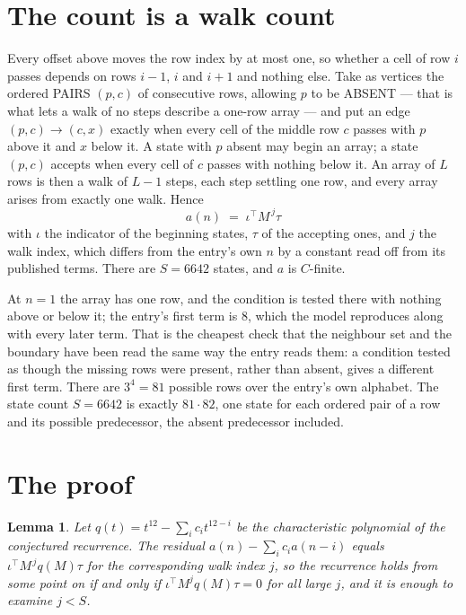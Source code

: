 \documentclass[11pt,a4paper]{article}
\theoremstyle{plain}
\newtheorem{lemma}[theorem]{Lemma}
\theoremstyle{definition}
\begin{document}
\section{The count is a walk count}

Every offset above moves the row index by at most one, so whether a cell of row $i$ passes
depends on rows $i-1$, $i$ and $i+1$ and nothing else. Take as vertices the ordered PAIRS
$(p,c)$ of consecutive rows, allowing $p$ to be ABSENT --- that is what lets a walk of no steps
describe a one-row array --- and put an edge $(p,c)\to(c,x)$ exactly when every cell of the
middle row $c$ passes with $p$ above it and $x$ below it. A state with $p$ absent may begin an
array; a state $(p,c)$ accepts when every cell of $c$ passes with nothing below it. An array of
$L$ rows is then a walk of $L-1$ steps, each step settling one row, and every array arises from
exactly one walk. Hence
\[
a(n)\;=\;\iota^{\!\top}M^{\,j}\tau
\]
with $\iota$ the indicator of the beginning states, $\tau$ of the accepting ones, and $j$ the
walk index, which differs from the entry's own $n$ by a constant read off from its published
terms. There are $S=6642$ states, and $a$ is $C$-finite.

At $n=1$ the array has one row, and
the condition is tested there with nothing above or below it; the entry's first term is
$8$, which the model reproduces along with every later term. That is the cheapest check
that the neighbour set and the boundary have been read the same way the entry reads them: a
condition tested as though the missing rows were present, rather than absent, gives a different
first term. There are $3^{4}=81$ possible rows over the entry's own alphabet. The state count $S=6642$ is exactly $81\cdot82$,
one state for each ordered pair of a row and its possible predecessor, the absent predecessor
included.

\section{The proof}

\begin{lemma}\label{lem:crit}
Let $q(t)=t^{12}-\sum_i c_it^{12-i}$ be the characteristic polynomial of the
conjectured recurrence. The residual $a(n)-\sum_ic_ia(n-i)$ equals
$\iota^{\!\top}M^{\,j}q(M)\tau$ for the corresponding walk index $j$, so the recurrence
holds from some point on if and only if $\iota^{\!\top}M^{j}q(M)\tau=0$ for all large $j$,
and it is enough to examine $j<S$.
\end{lemma}
\end{document}
